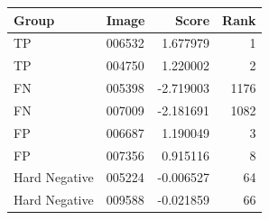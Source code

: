 \begin{tabular}{llrr}
\hline
Group & Image & Score & Rank \\
\hline
TP & 006532 & 1.677979 & 1 \\
TP & 004750 & 1.220002 & 2 \\
FN & 005398 & -2.719003 & 1176 \\
FN & 007009 & -2.181691 & 1082 \\
FP & 006687 & 1.190049 & 3 \\
FP & 007356 & 0.915116 & 8 \\
Hard Negative & 005224 & -0.006527 & 64 \\
Hard Negative & 009588 & -0.021859 & 66 \\
\hline
\end{tabular}
